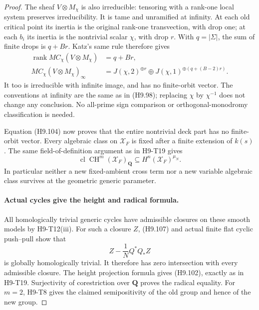 \begin{proof}
The sheaf $V\otimes M_\chi$ is also irreducible: tensoring
with a rank-one local system preserves irreducibility.
It is tame and unramified at infinity. At each old critical
point its inertia is the original rank-one transvection,
with drop one; at each $b_i$ its inertia is the nontrivial
scalar $\chi$, with drop $r$. With $q=|\Sigma|$, the sum
of finite drops is $q+Br$. Katz's same rule therefore gives
\[
 \begin{split}
 \operatorname{rank}MC_\chi(V\otimes M_\chi)&=q+Br,\\
 MC_\chi(V\otimes M_\chi)_\infty
   &=J(\chi,2)^{\oplus r}
        \oplus J(\chi,1)^{\oplus(q+(B-2)r)}.
 \end{split}                                                  \tag{H9.106}
\]
It too is irreducible with infinite image, and has no
finite-orbit vector. The conventions at infinity are the
same as in (H9.98); replacing $\chi$ by $\chi^{-1}$ does
not change any conclusion. No all-prime sign comparison or
orthogonal-monodromy classification is needed.

Equation (H9.104) now proves that the entire nontrivial deck
part has no finite-orbit vector. Every algebraic class on
$\mathcal X_F$ is fixed after a finite extension of $k(s)$.
The same field-of-definition argument as in H9-T19 gives
\[
 \operatorname{cl}\operatorname{CH}^m(\mathcal X_F)_{\mathbf Q}
                 \subseteq H^n(\mathcal X_F)^{\mu_N}.
                                                               \tag{H9.107}
\]
In particular neither a new fixed-ambient cross term nor a
new variable algebraic class survives at the geometric
generic parameter.

\paragraph{Actual cycles give the height and radical formula.}
All homologically trivial generic cycles have admissible
closures on these smooth models by H9-T12(iii). For such a
closure $Z$, (H9.107) and actual finite flat cyclic
push--pull show that
\[
                  Z-\frac1NQ^*Q_*Z
\]
is globally homologically trivial. It therefore has zero
intersection with every admissible closure. The height
projection formula gives (H9.102), exactly as in H9-T19.
Surjectivity of corestriction over $\mathbf Q$ proves the
radical equality. For $m=2$, H9-T8 gives the claimed
semipositivity of the old group and hence of the new group.


\end{proof}
